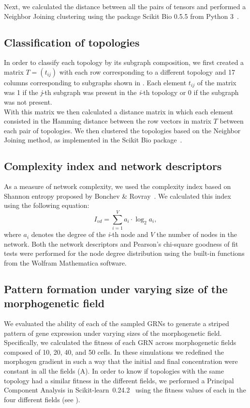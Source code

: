 \documentclass[10pt,letterpaper]{article}
\begin{document}
Next, we calculated the distance between all the pairs of tensors and performed
a Neighbor Joining clustering using the package Scikit Bio 0.5.5 from
Python 3~\cite{skbio2020}.

\subsection*{Classification of topologies}

In order to classify each topology by its subgraph composition, we first created
a matrix  $T = (t_{ij})$ with each row corresponding to a different topology
and 17 columns corresponding to subgraphs shown in .
Each element $t_{ij}$ of
the matrix was 1 if the \emph{j}-th subgraph was present in the \emph{i}-th
topology or 0 if the subgraph was not present.\\

With this matrix we then calculated a distance matrix in which each element
consisted in the Hamming distance between the row vectors in matrix $T$ between
each pair of topologies. We then clustered the topologies based on the
Neighbor Joining method, as implemented in the Scikit Bio
package~\cite{skbio2020}.

\subsection*{Complexity index and network descriptors}

As a measure of network complexity, we used the complexity index based on
Shannon entropy proposed by Bonchev \& Rovray~\cite{D.2005}. We calculated this
index using the following equation:
\begin{equation}
 I_{vd} = \sum_{i=1}^V a_i \cdot \log_{2} a_i,
\end{equation}
\noindent
where $a_i$ denotes the degree of the \emph{i}-th node and $V$ the number of
nodes in the network. Both the network descriptors and Pearson’s chi-square
goodness of fit tests were performed for the node degree distribution using
the built-in functions from the Wolfram Mathematica software.\\

\subsection*{Pattern formation under varying size of the morphogenetic field}
We evaluated the ability of each of the sampled GRNs to generate a striped
pattern of gene expression under varying sizes of the morphogenetic field.
Specifically, we calculated the fitness of each GRN across morphogenetic fields
composed of 10, 20, 40, and 50 cells. In these simulations we redefined the
morphogen gradient in such a way that the initial and final concentration were
constant in all the fields (A). In order to know if topologies
with the same topology had a similar fitness in the different fields, we performed
a Principal Component Analysis in Scikit-learn~0.24.2~\cite{sklearn} using the
fitness values of each in the four different fields (see ).
\end{document}
